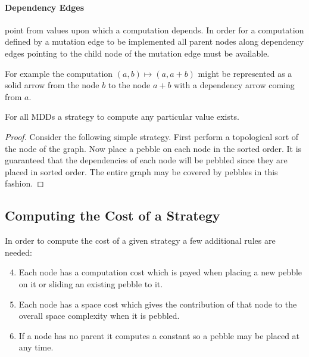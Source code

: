 \paragraph{Dependency Edges} point from values upon which a computation
depends. In order for a computation defined by a mutation edge to be implemented
all parent nodes along dependency edges pointing to the child node of the
mutation edge must be available.

For example the computation $(a,b)\mapsto(a,a+b)$ might be represented as a
solid arrow from the node $b$ to the node $a+b$ with a dependency arrow coming
from $a$.


\begin{theorem}
  For all MDDs a strategy to compute any particular value exists.
\end{theorem}

\begin{proof}

  Consider the following simple strategy.  First perform a topological sort of
  the node of the graph.  Now place a pebble on each node in the sorted order.
  It is guaranteed that the dependencies of each node will be pebbled since they
  are placed in sorted order. The entire graph may be covered by pebbles in this
  fashion.

\end{proof}




\subsection{Computing the Cost of a Strategy}

In order to compute the cost of a given strategy a few additional rules are
needed:

\begin{enumerate}
    \setcounter{enumi}{3}
  \item Each node has a computation cost which is payed when placing a new pebble on
    it or sliding an existing pebble to it.
  \item Each node has a space cost which gives the contribution of that node to
    the overall space complexity when it is pebbled.
  \item If a node has no parent it computes a constant so a pebble may be placed
    at any time.
\end{enumerate}

